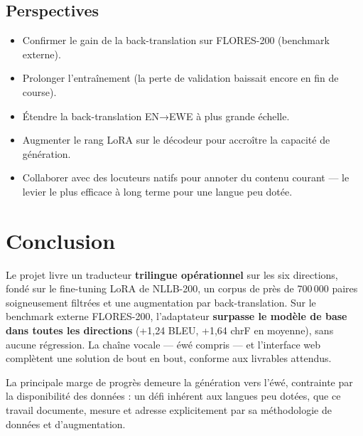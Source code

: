 \documentclass[11pt,a4paper]{article}
\begin{document}
\subsection{Perspectives}
\begin{itemize}[leftmargin=1.5em,itemsep=3pt]
  \item Confirmer le gain de la back-translation sur FLORES-200 (benchmark externe).
  \item Prolonger l'entraînement (la perte de validation baissait encore en fin de course).
  \item Étendre la back-translation EN→EWE à plus grande échelle.
  \item Augmenter le rang LoRA sur le décodeur pour accroître la capacité de génération.
  \item Collaborer avec des locuteurs natifs pour annoter du contenu courant — le levier
        le plus efficace à long terme pour une langue peu dotée.
\end{itemize}

\section{Conclusion}

Le projet livre un traducteur \textbf{trilingue opérationnel} sur les six directions,
fondé sur le fine-tuning LoRA de NLLB-200, un corpus de près de 700\,000 paires
soigneusement filtrées et une augmentation par back-translation. Sur le benchmark externe
FLORES-200, l'adaptateur \textbf{surpasse le modèle de base dans toutes les directions}
(+1,24 BLEU, +1,64 chrF en moyenne), sans aucune régression. La chaîne vocale — éwé
compris — et l'interface web complètent une solution de bout en bout, conforme aux
livrables attendus.

La principale marge de progrès demeure la génération vers l'éwé, contrainte par la
disponibilité des données : un défi inhérent aux langues peu dotées, que ce travail
documente, mesure et adresse explicitement par sa méthodologie de données et
d'augmentation.

\vfill
\end{document}
